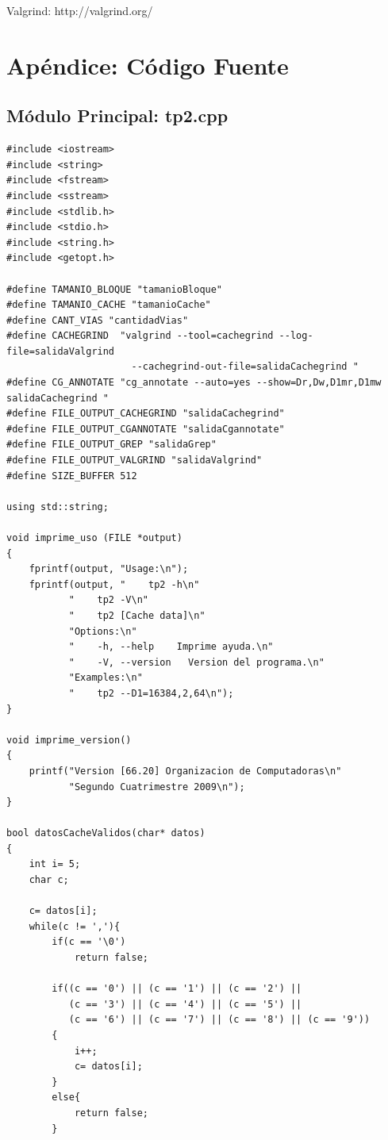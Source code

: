 \documentclass[a4paper,10pt]{article}
\begin{document}
\begin{thebibliography}{99}

Valgrind: http://valgrind.org/
\end{thebibliography}

\newpage

\appendix

\section{Ap\'endice: C\'odigo Fuente}

\subsection{M\'odulo Principal: tp2.cpp}
\begin{verbatim}
#include <iostream>
#include <string>
#include <fstream>
#include <sstream>
#include <stdlib.h>
#include <stdio.h>
#include <string.h>
#include <getopt.h>

#define TAMANIO_BLOQUE "tamanioBloque"
#define TAMANIO_CACHE "tamanioCache"
#define CANT_VIAS "cantidadVias"
#define CACHEGRIND  "valgrind --tool=cachegrind --log-file=salidaValgrind
                      --cachegrind-out-file=salidaCachegrind "
#define CG_ANNOTATE "cg_annotate --auto=yes --show=Dr,Dw,D1mr,D1mw salidaCachegrind "
#define FILE_OUTPUT_CACHEGRIND "salidaCachegrind"
#define FILE_OUTPUT_CGANNOTATE "salidaCgannotate"
#define FILE_OUTPUT_GREP "salidaGrep"
#define FILE_OUTPUT_VALGRIND "salidaValgrind"
#define SIZE_BUFFER 512

using std::string;

void imprime_uso (FILE *output)
{
    fprintf(output, "Usage:\n");
    fprintf(output, "    tp2 -h\n"
           "    tp2 -V\n"
           "    tp2 [Cache data]\n"
           "Options:\n"
           "    -h, --help    Imprime ayuda.\n"
           "    -V, --version   Version del programa.\n"
           "Examples:\n"
           "    tp2 --D1=16384,2,64\n");
}

void imprime_version()
{
    printf("Version [66.20] Organizacion de Computadoras\n"
           "Segundo Cuatrimestre 2009\n");
}

bool datosCacheValidos(char* datos)
{
    int i= 5;
    char c;

    c= datos[i];
    while(c != ','){
        if(c == '\0')
            return false;

        if((c == '0') || (c == '1') || (c == '2') ||
           (c == '3') || (c == '4') || (c == '5') ||
           (c == '6') || (c == '7') || (c == '8') || (c == '9'))
        {
            i++;
            c= datos[i];
        }
        else{
            return false;
        }


\end{verbatim}
\end{document}
